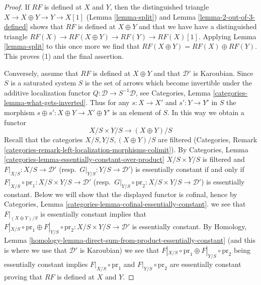 \begin{proof}
If $RF$ is defined at $X$ and $Y$, then the distinguished triangle
$X \to X \oplus Y \to Y \to X[1]$ (Lemma \ref{lemma-split}) and
Lemma \ref{lemma-2-out-of-3-defined}
shows that $RF$ is defined at $X \oplus Y$ and that we have
have a distinguished triangle
$RF(X) \to RF(X \oplus Y) \to RF(Y) \to RF(X)[1]$.
Applying Lemma \ref{lemma-split} to this once more we find
that $RF(X \oplus Y) = RF(X) \oplus RF(Y)$.
This proves (1) and the final assertion.

\medskip\noindent
Conversely, assume that $RF$ is defined at $X \oplus Y$ and that $\mathcal{D}'$
is Karoubian. Since $S$ is a saturated system $S$ is the set of arrows which
become invertible under the additive localization functor
$Q : \mathcal{D} \to S^{-1}\mathcal{D}$, see
Categories, Lemma \ref{categories-lemma-what-gets-inverted}.
Thus for any $s : X \to X'$ and $s' : Y \to Y'$ in $S$ the morphism
$s \oplus s' : X \oplus Y \to X' \oplus Y'$ is an element of $S$.
In this way we obtain a functor
$$
X/S \times Y/S \longrightarrow (X \oplus Y)/S
$$
Recall that the categories $X/S, Y/S, (X \oplus Y)/S$ are filtered
(Categories, Remark
\ref{categories-remark-left-localization-morphisms-colimit}).
By Categories, Lemma \ref{categories-lemma-essentially-constant-over-product}
$X/S \times Y/S$ is filtered and
$F|_{X/S} : X/S \to \mathcal{D}'$ (resp.\ $G|_{Y/S} : Y/S \to \mathcal{D}'$)
is essentially constant if and only if
$F|_{X/S} \circ \text{pr}_1 : X/S \times Y/S \to \mathcal{D}'$
(resp.\ $G|_{Y/S} \circ \text{pr}_2 : X/S \times Y/S \to \mathcal{D}'$)
is essentially constant. Below we will show that the displayed functor
is cofinal, hence by
Categories, Lemma \ref{categories-lemma-cofinal-essentially-constant}.
we see that $F|_{(X \oplus Y)/S}$ is essentially constant implies that
$F|_{X/S} \circ \text{pr}_1 \oplus F|_{Y/S} \circ \text{pr}_2 :
X/S \times Y/S \to \mathcal{D}'$
is essentially constant. By Homology, Lemma
\ref{homology-lemma-direct-sum-from-product-essentially-constant}
(and this is where we use that $\mathcal{D}'$ is Karoubian)
we see that 
$F|_{X/S} \circ \text{pr}_1 \oplus F|_{Y/S} \circ \text{pr}_2$
being essentially constant implies
$F|_{X/S} \circ \text{pr}_1$ and
$F|_{Y/S} \circ \text{pr}_2$ are essentially constant proving that $RF$ is
defined at $X$ and $Y$.


\end{proof}
